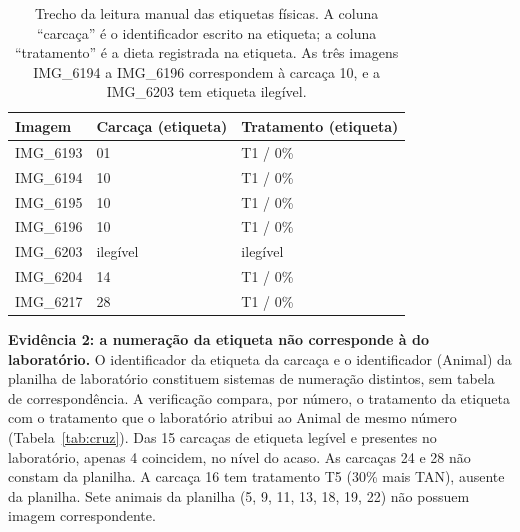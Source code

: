 \documentclass[12pt,a4paper]{article}
\begin{document}
\begin{table}[!ht]
\centering
\caption{Trecho da leitura manual das etiquetas físicas. A coluna ``carcaça'' é o
identificador escrito na etiqueta; a coluna ``tratamento'' é a dieta registrada na
etiqueta. As três imagens IMG\_6194 a IMG\_6196 correspondem à carcaça 10, e a IMG\_6203
tem etiqueta ilegível.}
\label{tab:tags}
\begin{tabular}{lll}
\toprule
Imagem & Carcaça (etiqueta) & Tratamento (etiqueta) \\
\midrule
IMG\_6193 & 01 & T1 / 0\% \\
IMG\_6194 & 10 & T1 / 0\% \\
IMG\_6195 & 10 & T1 / 0\% \\
IMG\_6196 & 10 & T1 / 0\% \\
IMG\_6203 & ilegível & ilegível \\
IMG\_6204 & 14 & T1 / 0\% \\
IMG\_6217 & 28 & T1 / 0\% \\
\bottomrule
\end{tabular}
\end{table}

\textbf{Evidência 2: a numeração da etiqueta não corresponde à do laboratório.} O
identificador da etiqueta da carcaça e o identificador (Animal) da planilha de
laboratório constituem sistemas de numeração distintos, sem tabela de correspondência.
A verificação compara, por número, o tratamento da etiqueta com o tratamento que o
laboratório atribui ao Animal de mesmo número (Tabela~\ref{tab:cruz}). Das 15 carcaças
de etiqueta legível e presentes no laboratório, apenas 4 coincidem, no nível do acaso.
As carcaças 24 e 28 não constam da planilha. A carcaça 16 tem tratamento T5 (30\% mais
TAN), ausente da planilha. Sete animais da planilha (5, 9, 11, 13, 18, 19, 22) não
possuem imagem correspondente.
\end{document}
